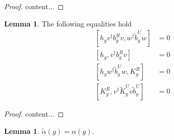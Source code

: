 \documentclass[12pt,a4paper,twoside]{article}
\theoremstyle{definition}
\newtheorem{lemma}[theorem]{Lemma}
\numberwithin{equation}{section}
\begin{document}
\begin{proof}
	content...
\end{proof}
\begin{lemma}
	The following equalities hold
	\begin{align}
		\label{eq:H^1IndexRotationInvariantCommutator1}
		[h_g v^\dagger b_g^R v,w^\dagger \tilde{b}_g^U w]&=0\\
		\label{eq:H^1IndexRotationInvariantCommutator2}
		[h_g, v^\dagger b_g^R v]&=0\\
		\label{eq:H^1IndexRotationInvariantCommutator3}
		[h_g w^\dagger \tilde{b}_g^U w,K_g^R]&=0\\
		\label{eq:H^1IndexRotationInvariantCommutator4}
		[K_g^R,v^\dagger \tilde{K}_g^U v\tilde{b}_g^U]&=0
	\end{align}
\end{lemma}
\begin{proof}
	content...
\end{proof}
\begin{lemma}
	$\tilde{\alpha}(g)=\alpha(g)$.
\end{lemma}
\end{document}
